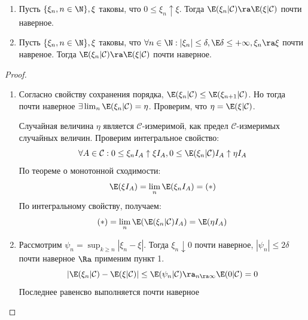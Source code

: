 \begin{proposition}
    \begin{enumerate}
        \item Пусть \(\{\xi_n, n \in \N\}, \xi\) таковы, что \(0 \le \xi_n \uparrow \xi\). Тогда \(\E(\xi_n|\mathcal{C}) \ra \E(\xi|\mathcal{C})\) почти наверное.
        \item Пусть \(\{\xi_n, n \in \N\}, \xi\) таковы, что \(\forall n \in \N: |\xi_n| \le \delta, \E\delta \le +\infty, \xi_n \ra \xi\) почти навреное. Тогда \(\E(\xi_n|\mathcal{C}) \ra \E(\xi|\mathcal{C})\) почти наверное.
    \end{enumerate}
\end{proposition}
\begin{proof}
    \begin{enumerate}
        \item Согласно свойству сохранения порядка, \(\E(\xi_n|\mathcal{C}) \le \E(\xi_{n + 1}|\mathcal{C})\). Но тогда почти наверное \(\exists \lim_{n} \E(\xi_n|\mathcal{C}) = \eta\). Проверим, что \(\eta = \E(\xi|\mathcal{C})\). 
        
        Случайная величина \(\eta\) является \(\mathcal{C}\)-измеримой, как предел \(\mathcal{C}\)-измеримых случайных величин. Проверим интегральное свойство:
        \[\forall A \in \mathcal{C}: 0 \le \xi_n I_A \uparrow \xi I_A, 0 \le \E(\xi_n|\mathcal{C})I_A \uparrow \eta I_A\]
        По теореме о монотонной сходимости:
        \[\E(\xi I_A) = \lim_n \E(\xi_n I_A) = (*)\]
        По интегральному свойству, получаем:
        \[(*) = \lim_n \E(\E(\xi_n|\mathcal{C})I_A) = \E(\eta I_A)\]

        \item Рассмотрим \(\psi_n = \sup_{k \ge n} |\xi_n - \xi|\). Тогда \(\xi_n \downarrow 0\) почти наверное, \(|\psi_n| \le 2\delta\) почти наверное \(\Ra\) применим пункт 1.
        \[|\E(\xi_n|\mathcal{C}) - \E(\xi|\mathcal{C})| \le \E(\psi_n|\mathcal{C}) \ra_{n \ra \infty} \E(0|\mathcal{C}) = 0\]
        Последнее равенсво выполняется почти наверное
    \end{enumerate}
\end{proof}



